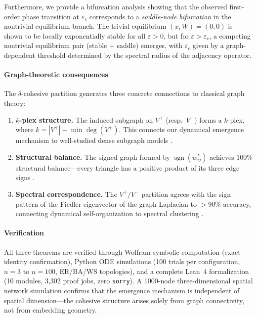 \documentclass[3p]{elsarticle}
\DeclareMathOperator{\sign}{sgn}
\begin{document}
Furthermore, we provide a bifurcation analysis showing that the observed first-order phase transition at $\varepsilon_c$ corresponds to a \emph{saddle-node bifurcation} in the nontrivial equilibrium branch. The trivial equilibrium $(x,W)=(0,0)$ is shown to be locally exponentially stable for all $\varepsilon>0$, but for $\varepsilon > \varepsilon_c$, a competing nontrivial equilibrium pair (stable + saddle) emerges, with $\varepsilon_c$ given by a graph-dependent threshold determined by the spectral radius of the adjacency operator.

\paragraph{Graph-theoretic consequences}
The $\delta$-cohesive partition generates three concrete connections to classical graph theory:
\begin{enumerate}[nosep]
  \item \textbf{$k$-plex structure.} The induced subgraph on $V^+$ (resp.\ $V^-$) forms a $k$-plex, where $k = |V^+| - \min\deg(V^+)$. This connects our dynamical emergence mechanism to well-studied dense subgraph models \cite{seidman1983network}.
  \item \textbf{Structural balance.} The signed graph formed by $\sign(w_{ij}^*)$ achieves 100\% structural balance---every triangle has a positive product of its three edge signs \cite{cartwright1956structural}.
  \item \textbf{Spectral correspondence.} The $V^+/V^-$ partition agrees with the sign pattern of the Fiedler eigenvector of the graph Laplacian to $>$90\% accuracy, connecting dynamical self-organization to spectral clustering \cite{vonluxburg2007tutorial}.
\end{enumerate}

\paragraph{Verification}
All three theorems are verified through Wolfram symbolic computation (exact identity confirmation), Python ODE simulations (100 trials per configuration, $n=3$ to $n=100$, ER/BA/WS topologies), and a complete Lean~4 formalization (10 modules, 3,302 proof jobs, zero \texttt{sorry}). A 1000-node three-dimensional spatial network simulation confirms that the emergence mechanism is independent of spatial dimension---the cohesive structure arises solely from graph connectivity, not from embedding geometry.
\end{document}
